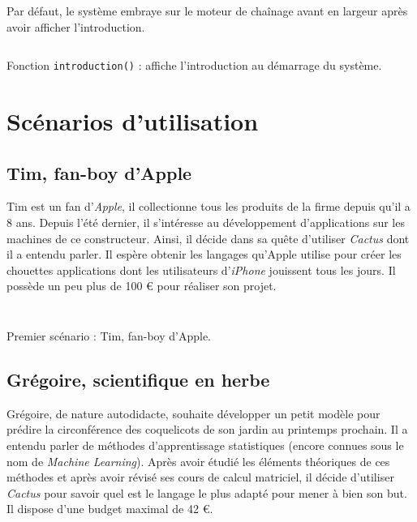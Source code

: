 \documentclass[a4paper,12pt]{article}
\begin{document}
	Par défaut, le système embraye sur le moteur de chaînage avant en largeur après avoir afficher l'introduction.
	
\begin{listing}[H]
	\centering
	\inputminted[breaklines=true,linenos]{lisp}{../intro.lisp}
	\caption{Fonction \texttt{introduction()} : affiche l'introduction au démarrage du système.}
\end{listing}
	
\section{Scénarios d'utilisation}

	\subsection{Tim, fan-boy d'Apple}
	
	Tim est un fan d'\textit{Apple}, il collectionne tous les produits de la firme depuis qu'il a 8 ans. Depuis l'été dernier, il s'intéresse au développement d'applications sur les machines de ce constructeur. Ainsi, il décide dans sa quête d'utiliser \textit{Cactus} dont il a entendu parler. Il espère obtenir les langages qu'Apple utilise pour créer les chouettes applications dont les utilisateurs d'\textit{iPhone} jouissent tous les jours. Il possède un peu plus de 100 € pour réaliser son projet.

\begin{listing}[H]
	\centering
	\inputminted[breaklines=true,linenos,lastline=29]{text}{../scenarioTim.txt}
\end{listing}
	
\begin{listing}[H]
	\centering
	\inputminted[breaklines=true,linenos,firstline=30]{text}{../scenarioTim.txt}
	\caption{Premier scénario : Tim, fan-boy d'Apple.}
\end{listing}


	\subsection{Grégoire, scientifique en herbe}
	
	Grégoire, de nature autodidacte, souhaite développer un petit modèle pour prédire la circonférence des coquelicots de son jardin au printemps prochain. Il a entendu parler de méthodes d'apprentissage statistiques (encore connues sous le nom de \textit{Machine Learning}). Après avoir étudié les éléments théoriques de ces méthodes et après avoir révisé ses cours de calcul matriciel, il décide d'utiliser \textit{Cactus} pour savoir quel est le langage le plus adapté pour mener à bien son but. Il dispose d'une budget maximal de 42 €.
\end{document}
